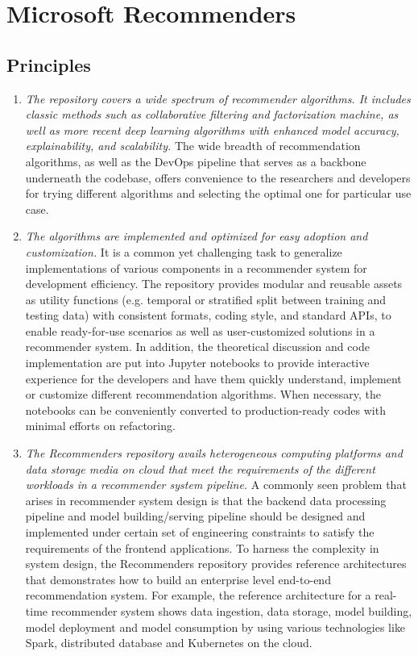\documentclass[twoside,11pt]{article}
\begin{document}
\section{Microsoft Recommenders}
\subsection{Principles}
\begin{enumerate}
\item \emph{The repository covers a wide spectrum of recommender algorithms. It includes classic methods such as collaborative filtering and factorization machine, as well as more recent deep learning algorithms with enhanced model accuracy, explainability, and scalability.} The wide breadth of recommendation algorithms, as well as the DevOps pipeline that serves as a backbone underneath the codebase, offers convenience to the researchers and developers for trying different algorithms and selecting the optimal one for particular use case. 
\item \emph{The algorithms are implemented and optimized for easy adoption and customization.} It is a common yet challenging task to generalize implementations of various components in a recommender system for development efficiency. The repository provides modular and reusable assets as utility functions (e.g. temporal or stratified split between training and testing data) with consistent formats, coding style, and standard APIs, to enable ready-for-use scenarios as well as user-customized solutions in a recommender system. In addition, the theoretical discussion and code implementation are put into Jupyter notebooks to provide interactive experience for the developers and have them quickly understand, implement or customize different recommendation algorithms. When necessary, the notebooks can be conveniently converted to production-ready codes with minimal efforts on refactoring. 
\item \emph{The Recommenders repository avails heterogeneous computing platforms and data storage media on cloud that meet the requirements of the different workloads in a recommender system pipeline.} A commonly seen problem that arises in recommender system design is that the backend data processing pipeline and model building/serving pipeline should be designed and implemented under certain set of engineering constraints to satisfy the requirements of the frontend applications. To harness the complexity in system design, the Recommenders repository provides reference architectures that demonstrates how to build an enterprise level end-to-end recommendation system. For example, the reference architecture for a real-time recommender system shows data ingestion, data storage, model building, model deployment and model consumption by using various technologies like Spark, distributed database and Kubernetes on the cloud. 
\end{enumerate}
\end{document}
